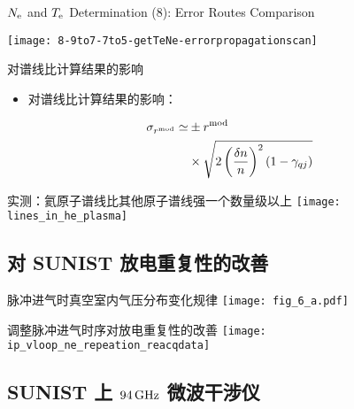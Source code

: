 \begin{frame}{$N_{\rm e}$ and $T_{\rm e}$ Determination (8): Error Routes Comparison}
	\vspace{-0.3cm}
	\begin{center}
		\texttt{[image: 8-9to7-7to5-getTeNe-errorpropagationscan]}
	\end{center}
\end{frame}


\begin{frame}{对谱线比计算结果的影响}
	\begin{itemize}
        \item 对谱线比计算结果的影响：
    \end{itemize}
    \begin{align*}
    \sigma_{r^{\rm mod}} \simeq & \pm r^{\rm mod} \\
    & \times\sqrt{2\left(\frac{\delta n}{n}\right)^2(1-\gamma_{qj})}
    \end{align*}

\end{frame}

\begin{frame}{实测：氦原子谱线比其他原子谱线强一个数量级以上}
	\centering
	\texttt{[image: lines\_in\_he\_plasma]}
\end{frame}

\subsection{对 SUNIST 放电重复性的改善}

\begin{frame}{脉冲进气时真空室内气压分布变化规律}
	\centering
	\texttt{[image: fig\_6\_a.pdf]}\\
\end{frame}

\begin{frame}{调整脉冲进气时序对放电重复性的改善}
	\centering
	\texttt{[image: ip\_vloop\_ne\_repeation\_reacqdata]}
\end{frame}

\subsection{SUNIST 上 $94\,{\rm GHz}$ 微波干涉仪}

